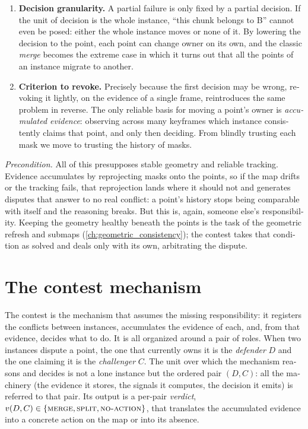 \begin{otherlanguage}{english}
\begin{enumerate}
  \item \textbf{Decision granularity.}
  A partial failure is only fixed by a partial decision. If the unit of decision is the whole
  instance, \enquote{this chunk belongs to B} cannot even be posed: either the whole instance moves
  or none of it. By lowering the decision to the point, each point can change owner on its own, and
  the classic \emph{merge} becomes the extreme case in which it turns out that all the points of an
  instance migrate to another.

  \item \textbf{Criterion to revoke.}
  Precisely because the first decision may be wrong, revoking it lightly, on the evidence of a single
  frame, reintroduces the same problem in reverse. The only reliable basis for moving a point's owner
  is \emph{accumulated evidence}: observing across many keyframes which instance consistently claims
  that point, and only then deciding. From blindly trusting each mask we move to trusting the history
  of masks.
\end{enumerate}

\medskip
\noindent\emph{Precondition.} All of this presupposes stable geometry and reliable tracking. Evidence
accumulates by reprojecting masks onto the points, so if the map drifts or the tracking fails, that
reprojection lands where it should not and generates disputes that answer to no real conflict: a
point's history stops being comparable with itself and the reasoning breaks. But this is, again,
someone else's responsibility. Keeping the geometry healthy beneath the points is the task of the
geometric refresh and submaps (\ref{ch:geometric_consistency}); the contest takes that condition as
solved and deals only with its own, arbitrating the dispute.

\section{The contest mechanism}
\label{sec:contest_mechanism}

The contest is the mechanism that assumes the missing responsibility: it registers the conflicts
between instances, accumulates the evidence of each, and, from that evidence, decides what to do. It
is all organized around a pair of roles. When two instances dispute a point, the one that currently
owns it is the \emph{defender} $D$ and the one claiming it is the \emph{challenger} $C$. The unit
over which the mechanism reasons and decides is not a lone instance but the ordered pair $(D, C)$:
all the machinery (the evidence it stores, the signals it computes, the decision it emits) is
referred to that pair. Its output is a per-pair \emph{verdict}, $v(D, C) \in \{\textsc{merge},
\textsc{split}, \textsc{no-action}\}$, that translates the accumulated evidence into a concrete
action on the map or into its absence.


\end{otherlanguage}
